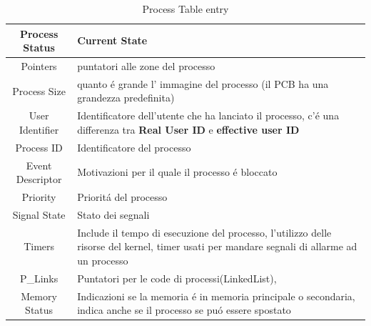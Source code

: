 \documentclass[11pt]{article}
\begin{document}
\begin{table}[H]
    \raggedright
    \begin{tabular}{|c|p{10cm}|}
        \hline
        Process Status & Current State \\
        \hline
        Pointers & puntatori alle zone del processo\\
        \hline
        Process Size & quanto é grande l' immagine del processo (il PCB ha una grandezza predefinita) \\
        \hline
        User Identifier & Identificatore dell'utente che ha lanciato il processo, c'é una differenza tra \textbf{Real User ID} e \textbf{ effective user ID}  \\
        \hline
        Process ID & Identificatore del processo \\
        \hline
        Event Descriptor & Motivazioni per il quale il processo é bloccato \\
        \hline
        Priority & Prioritá del processo \\
        \hline
        Signal State & Stato dei segnali \\
        \hline
        Timers & Include il tempo di esecuzione del processo, l'utilizzo delle risorse del kernel, timer usati per mandare segnali di allarme ad un processo \\
        \hline
        P_Links & Puntatori per le code di processi(LinkedList), \\
        \hline
        Memory Status & Indicazioni se la memoria é in memoria principale o secondaria, indica anche se il processo se puó essere spostato \\
        \hline
    \end{tabular}
    \caption{Process Table entry}
    \label{tab:esempio}
\end{table}
\end{document}

